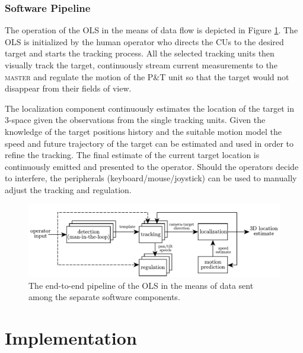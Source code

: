 \subsection{Software Pipeline} \label{txt:sw_pipeline}

The operation of the OLS in the means of data flow is depicted in Figure \ref{fig:pipeline}. The OLS is initialized by the human operator who directs the CUs to the desired target and starts the tracking process. All the selected tracking units then visually track the target, continuously stream current measurements to the \textsc{master} and regulate the motion of the P\&T unit so that the target would not disappear from their fields of view.

The localization component continuously estimates the location of the target in 3-space given the observations from the single tracking units. Given the knowledge of the target positions history and the suitable motion model the speed and future trajectory of the target can be estimated and used in order to refine the tracking. The final estimate of the current target location is continuously emitted and presented to the operator. Should the operators decide to interfere, the peripherals (keyboard/mouse/joystick) can be used to manually adjust the tracking and regulation.

\begin{figure}[htb]
	\centering
	\includegraphics[width=0.95\linewidth]{fig/pipeline.pdf}
	\caption{The end-to-end pipeline of the OLS in the means of data sent among the separate software components.}
	\label{fig:pipeline}
\end{figure}


\chapter{Implementation} \label{txt:implementation}

